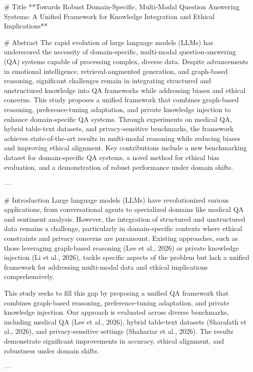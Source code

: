 # Title  
**Towards Robust Domain-Specific, Multi-Modal Question Answering Systems: A Unified Framework for Knowledge Integration and Ethical Implications**

# Abstract  
The rapid evolution of large language models (LLMs) has underscored the necessity of domain-specific, multi-modal question-answering (QA) systems capable of processing complex, diverse data. Despite advancements in emotional intelligence, retrieval-augmented generation, and graph-based reasoning, significant challenges remain in integrating structured and unstructured knowledge into QA frameworks while addressing biases and ethical concerns. This study proposes a unified framework that combines graph-based reasoning, preference-tuning adaptation, and private knowledge injection to enhance domain-specific QA systems. Through experiments on medical QA, hybrid table-text datasets, and privacy-sensitive benchmarks, the framework achieves state-of-the-art results in multi-modal reasoning while reducing biases and improving ethical alignment. Key contributions include a new benchmarking dataset for domain-specific QA systems, a novel method for ethical bias evaluation, and a demonstration of robust performance under domain shifts.  

---

# Introduction  
Large language models (LLMs) have revolutionized various applications, from conversational agents to specialized domains like medical QA and sentiment analysis. However, the integration of structured and unstructured data remains a challenge, particularly in domain-specific contexts where ethical constraints and privacy concerns are paramount. Existing approaches, such as those leveraging graph-based reasoning (Lee et al., 2026) or private knowledge injection (Li et al., 2026), tackle specific aspects of the problem but lack a unified framework for addressing multi-modal data and ethical implications comprehensively.  

This study seeks to fill this gap by proposing a unified QA framework that combines graph-based reasoning, preference-tuning adaptation, and private knowledge injection. Our approach is evaluated across diverse benchmarks, including medical QA (Lee et al., 2026), hybrid table-text datasets (Sharafath et al., 2026), and privacy-sensitive settings (Shahariar et al., 2026). The results demonstrate significant improvements in accuracy, ethical alignment, and robustness under domain shifts.  

---

